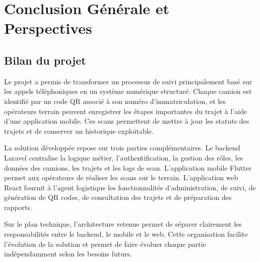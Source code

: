 \chapter*{Conclusion Générale et Perspectives}
{}


\section*{Bilan du projet}
{}

Le projet a permis de transformer un processus de suivi principalement basé sur les appels téléphoniques en un système numérique structuré. Chaque camion est identifié par un code QR associé à son numéro d'immatriculation, et les opérateurs terrain peuvent enregistrer les étapes importantes du trajet à l'aide d'une application mobile. Ces scans permettent de mettre à jour les statuts des trajets et de conserver un historique exploitable.

La solution développée repose sur trois parties complémentaires. Le backend Laravel centralise la logique métier, l'authentification, la gestion des rôles, les données des camions, les trajets et les logs de scan. L'application mobile Flutter permet aux opérateurs de réaliser les scans sur le terrain. L'application web React fournit à l'agent logistique les fonctionnalités d'administration, de suivi, de génération de QR codes, de consultation des trajets et de préparation des rapports.

Sur le plan technique, l'architecture retenue permet de séparer clairement les responsabilités entre le backend, le mobile et le web. Cette organisation facilite l'évolution de la solution et permet de faire évoluer chaque partie indépendamment selon les besoins futurs.


